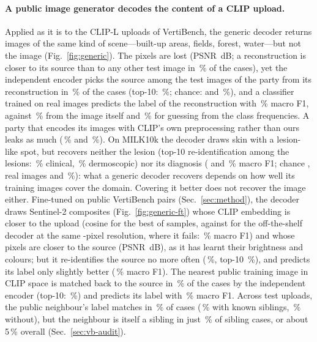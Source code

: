 \paragraph{A public image generator decodes the content of a CLIP upload.}
Applied as it is to the CLIP-L uploads of VertiBench, the generic decoder returns images of the same kind of scene---built-up areas, fields, forest, water---but not the image (Fig.~\ref{fig:generic}). The pixels are lost (PSNR \giVbPsnr\,dB; a reconstruction is closer to its source than to any other test image in \giVbPixReid\,\% of the cases), yet the independent encoder picks the source among the \giVbNTest{} test images of the party from its reconstruction in \giVbReid\,\% of the cases (top-10: \giVbReidTen\,\%; chance: \giVbChance{} and \giVbChanceTen\,\%), and a classifier trained on real images predicts the label of the reconstruction with \giVbLabFone\,\% macro F1, against \giVbRealFone\,\% from the image itself and \giVbChanceFone\,\% for guessing from the class frequencies. A party that encodes its images with CLIP's own preprocessing rather than ours leaks as much (\giVbClipReid\,\% and \giVbClipLabFone\,\%). On MILK10k the decoder draws skin with a lesion-like spot, but recovers neither the lesion (top-10 re-identification among the \giMilkNGal{} lesions: \giMilkClinReidTen\,\% clinical, \giMilkDermReidTen\,\% dermoscopic) nor its diagnosis (\giMilkClinLabFone{} and \giMilkDermLabFone\,\% macro F1; chance \giMilkChanceFone, real images \giMilkClinRealFone{} and \giMilkDermRealFone\,\%): what a generic decoder recovers depends on how well its training images cover the domain. Covering it better does not recover the image either. Fine-tuned on public VertiBench pairs (Sec.~\ref{sec:method}), the decoder draws Sentinel-2 composites (Fig.~\ref{fig:generic-ft}) whose CLIP embedding is closer to the upload (cosine \giftBestClip{} for the best of \giftNBest{} samples, against \giftOffClip{} for the off-the-shelf decoder at the same \giftSize-pixel resolution, where it fails: \giVbOffLabFone\,\% macro F1) and whose pixels are closer to the source (PSNR \giVbBestPsnr\,dB), as it has learnt their brightness and colours; but it re-identifies the source no more often (\giVbBestReid\,\%, top-10 \giVbBestReidTen\,\%), and predicts its label only slightly better (\giVbBestLabFone\,\% macro F1). The nearest public training image in CLIP space is matched back to the source in \giVbNnReid\,\% of the cases by the independent encoder (top-10: \giVbNnReidTen\,\%) and predicts its label with \giVbNnLabFone\,\% macro F1. Across test uploads, the public neighbour's label matches in \nnPubAll\,\% of cases (\nnPubSib\,\% with known siblings, \nnPubNoSib\,\% without), but the neighbour is itself a sibling in just \nnPubIsSib\,\% of sibling cases, or about 5\,\% overall (Sec.~\ref{sec:vb-audit}).


